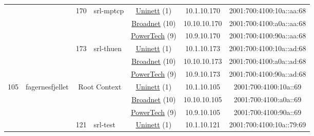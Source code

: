 \begin{small}
\begin{center}
\begin{longtable}{|c|c|c|c|c|c|c|c|}
  &  & \multirow{3}{*}{\tiny{170}} & \multicolumn{1}{|l|}{\multirow{3}{*}{\tiny{srl-mptcp}}} & \multicolumn{2}{|c|}{\tiny{\href{https://www.uninett.no}{Uninett} (1)}} & \tiny{10.1.10.170} & \tiny{2001:700:4100:10a::aa:68} \\* \cline{5-5}\cline{6-6}\cline{7-7}\cline{8-8}
  &  &  &  & \multicolumn{2}{|c|}{\tiny{\href{https://www.broadnet.no}{Broadnet} (10)}} & \tiny{10.10.10.170} & \tiny{2001:700:4100:a0a::aa:68} \\* \cline{5-5}\cline{6-6}\cline{7-7}\cline{8-8}
  &  &  &  & \multicolumn{2}{|c|}{\tiny{\href{http://www.powertech.no}{PowerTech} (9)}} & \tiny{10.9.10.170} & \tiny{2001:700:4100:90a::aa:68} \\* \cline{3-3}\cline{4-4}\cline{5-5}\cline{6-6}\cline{7-7}\cline{8-8}
  &  & \multirow{3}{*}{\tiny{173}} & \multicolumn{1}{|l|}{\multirow{3}{*}{\tiny{srl-thuen}}} & \multicolumn{2}{|c|}{\tiny{\href{https://www.uninett.no}{Uninett} (1)}} & \tiny{10.1.10.173} & \tiny{2001:700:4100:10a::ad:68} \\* \cline{5-5}\cline{6-6}\cline{7-7}\cline{8-8}
  &  &  &  & \multicolumn{2}{|c|}{\tiny{\href{https://www.broadnet.no}{Broadnet} (10)}} & \tiny{10.10.10.173} & \tiny{2001:700:4100:a0a::ad:68} \\* \cline{5-5}\cline{6-6}\cline{7-7}\cline{8-8}
  &  &  &  & \multicolumn{2}{|c|}{\tiny{\href{http://www.powertech.no}{PowerTech} (9)}} & \tiny{10.9.10.173} & \tiny{2001:700:4100:90a::ad:68} \\ \hline
 \multirow{30}{*}{\tiny{105}} & \multicolumn{1}{|l|}{\multirow{30}{*}{\tiny{fagernesfjellet}}} & \multicolumn{2}{|c|}{\multirow{3}{*}{\tiny{Root Context}}} & \multicolumn{2}{|c|}{\tiny{\href{https://www.uninett.no}{Uninett} (1)}} & \tiny{10.1.10.105} & \tiny{2001:700:4100:10a::69} \\* \cline{5-5}\cline{6-6}\cline{7-7}\cline{8-8}
  &  & \multicolumn{2}{|c|}{} & \multicolumn{2}{|c|}{\tiny{\href{https://www.broadnet.no}{Broadnet} (10)}} & \tiny{10.10.10.105} & \tiny{2001:700:4100:a0a::69} \\* \cline{5-5}\cline{6-6}\cline{7-7}\cline{8-8}
  &  & \multicolumn{2}{|c|}{} & \multicolumn{2}{|c|}{\tiny{\href{http://www.powertech.no}{PowerTech} (9)}} & \tiny{10.9.10.105} & \tiny{2001:700:4100:90a::69} \\* \cline{3-3}\cline{4-4}\cline{5-5}\cline{6-6}\cline{7-7}\cline{8-8}
  &  & \multirow{3}{*}{\tiny{121}} & \multicolumn{1}{|l|}{\multirow{3}{*}{\tiny{srl-test}}} & \multicolumn{2}{|c|}{\tiny{\href{https://www.uninett.no}{Uninett} (1)}} & \tiny{10.1.10.121} & \tiny{2001:700:4100:10a::79:69} \\* \cline{5-5}\cline{6-6}\cline{7-7}\cline{8-8}

\end{longtable}
\end{center}
\end{small}

